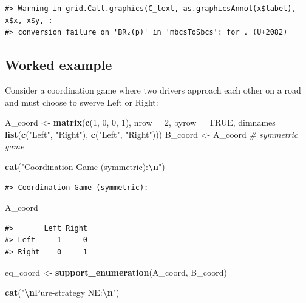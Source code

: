 \documentclass[
]{article}
\newenvironment{Shaded}{\begin{snugshade}}{\end{snugshade}}
\newcommand{\AttributeTok}[1]{\textcolor[rgb]{0.13,0.29,0.53}{#1}}
\newcommand{\CommentTok}[1]{\textcolor[rgb]{0.56,0.35,0.01}{\textit{#1}}}
\newcommand{\ConstantTok}[1]{\textcolor[rgb]{0.56,0.35,0.01}{#1}}
\newcommand{\DecValTok}[1]{\textcolor[rgb]{0.00,0.00,0.81}{#1}}
\newcommand{\FunctionTok}[1]{\textcolor[rgb]{0.13,0.29,0.53}{\textbf{#1}}}
\newcommand{\NormalTok}[1]{#1}
\newcommand{\OtherTok}[1]{\textcolor[rgb]{0.56,0.35,0.01}{#1}}
\newcommand{\SpecialCharTok}[1]{\textcolor[rgb]{0.81,0.36,0.00}{\textbf{#1}}}
\newcommand{\StringTok}[1]{\textcolor[rgb]{0.31,0.60,0.02}{#1}}
\begin{document}
\begin{verbatim}
#> Warning in grid.Call.graphics(C_text, as.graphicsAnnot(x$label), x$x, x$y, :
#> conversion failure on 'BR₂(p)' in 'mbcsToSbcs': for ₂ (U+2082)
\end{verbatim}

\subsection{Worked example}\label{worked-example}

Consider a coordination game where two drivers approach each other on a
road and must choose to swerve Left or Right:

\begin{Shaded}
\begin{Highlighting}[]
\NormalTok{A\_coord }\OtherTok{\textless{}{-}} \FunctionTok{matrix}\NormalTok{(}\FunctionTok{c}\NormalTok{(}\DecValTok{1}\NormalTok{, }\DecValTok{0}\NormalTok{, }\DecValTok{0}\NormalTok{, }\DecValTok{1}\NormalTok{), }\AttributeTok{nrow =} \DecValTok{2}\NormalTok{, }\AttributeTok{byrow =} \ConstantTok{TRUE}\NormalTok{,}
                  \AttributeTok{dimnames =} \FunctionTok{list}\NormalTok{(}\FunctionTok{c}\NormalTok{(}\StringTok{"Left"}\NormalTok{, }\StringTok{"Right"}\NormalTok{), }\FunctionTok{c}\NormalTok{(}\StringTok{"Left"}\NormalTok{, }\StringTok{"Right"}\NormalTok{)))}
\NormalTok{B\_coord }\OtherTok{\textless{}{-}}\NormalTok{ A\_coord  }\CommentTok{\# symmetric game}

\FunctionTok{cat}\NormalTok{(}\StringTok{"Coordination Game (symmetric):}\SpecialCharTok{\textbackslash{}n}\StringTok{"}\NormalTok{)}
\end{Highlighting}
\end{Shaded}

\begin{verbatim}
#> Coordination Game (symmetric):
\end{verbatim}

\begin{Shaded}
\begin{Highlighting}[]
\NormalTok{A\_coord}
\end{Highlighting}
\end{Shaded}

\begin{verbatim}
#>       Left Right
#> Left     1     0
#> Right    0     1
\end{verbatim}

\begin{Shaded}
\begin{Highlighting}[]
\NormalTok{eq\_coord }\OtherTok{\textless{}{-}} \FunctionTok{support\_enumeration}\NormalTok{(A\_coord, B\_coord)}

\FunctionTok{cat}\NormalTok{(}\StringTok{"}\SpecialCharTok{\textbackslash{}n}\StringTok{Pure{-}strategy NE:}\SpecialCharTok{\textbackslash{}n}\StringTok{"}\NormalTok{)}
\end{Highlighting}
\end{Shaded}
\end{document}
